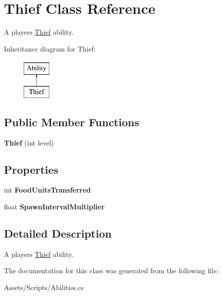 \hypertarget{class_thief}{}\section{Thief Class Reference}
\label{class_thief}


A player\textquotesingle{}s \hyperlink{class_thief}{Thief} ability.  


Inheritance diagram for Thief\+:\begin{figure}[H]
\begin{center}
\leavevmode
\includegraphics[height=2.000000cm]{class_thief}
\end{center}
\end{figure}
\subsection*{Public Member Functions}
\begin{DoxyCompactItemize}
\item 
{\bfseries Thief} (int level)\hypertarget{class_thief_aa049df83957df923ee073f352874ef17}{}\label{class_thief_aa049df83957df923ee073f352874ef17}

\end{DoxyCompactItemize}
\subsection*{Properties}
\begin{DoxyCompactItemize}
\item 
int {\bfseries Food\+Units\+Transferred}\hypertarget{class_thief_ad1ed53c6f931d1a648ea80a20009f476}{}\label{class_thief_ad1ed53c6f931d1a648ea80a20009f476}

\item 
float {\bfseries Spawn\+Interval\+Multiplier}\hypertarget{class_thief_adc3adc4afd7f38419f32b138a0fbd2cd}{}\label{class_thief_adc3adc4afd7f38419f32b138a0fbd2cd}

\end{DoxyCompactItemize}


\subsection{Detailed Description}
A player\textquotesingle{}s \hyperlink{class_thief}{Thief} ability. 



The documentation for this class was generated from the following file\+:\begin{DoxyCompactItemize}
\item 
Assets/\+Scripts/Abilities.\+cs\end{DoxyCompactItemize}
